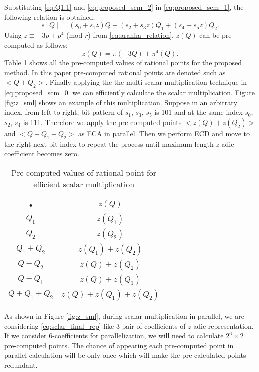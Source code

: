 Substituting \eqref{eq:Q1.1} and \eqref{eq:proposed_scm_2} in \eqref{eq:proposed_scm_1}, the following relation is obtained. 
\begin{equation}\label{eq:proposed_scm_0}
s[Q] =  (s_0+s_1z)Q + (s_2 +s_3z)Q_1 +(s_4+s_5z)Q_2.
\end{equation}
Using $z \equiv -3p + p^4$ (mod $r$) from \eqref{eq:aranha_relation}, $z(Q)$ can be pre-computed as follows:
\begin{equation}
z(Q) = \pi(-3Q) +\pi^4(Q).
\end{equation}
Table \ref{pre-compute} shows all the pre-computed values of rational points for the proposed method. In this paper pre-computed rational points are denoted such as $<Q+Q_2>$. Finally applying the the multi-scalar multiplication technique in \eqref{eq:proposed_scm_0} we can efficiently calculate the scalar multiplication. Figure \ref{fig:z_sml} shows an example of this multiplication. Suppose in an arbitrary index, from left to right, bit pattern of $s_1$, $s_3$, $s_5$ is 101 and at the same index $s_0$, $s_2$, $s_4$ is 111. Therefore we apply the pre-computed points $< z(Q)+z(Q_2) >$ and $<Q+Q_1+Q_2>$ as ECA in parallel. Then we perform ECD and move to the right next bit index to repeat the process until maximum length $z$-adic coefficient becomes zero.

\renewcommand{\baselinestretch}{1.5}
\begin{table}[!ht]
\centering
\caption{ Pre-computed values of rational point for efficient scalar multiplication}
\label{pre-compute}
\begin{tabular}{|c|c|}
\hline 
• & $z(Q)$ \\ 
\hline 
$Q_1$ & $z(Q_1)$  \\ 
\hline 
$Q_2$ & $z(Q_2)$ \\ 
\hline 
$Q_1+Q_2$ & \quad  $ z(Q_1)+ z(Q_2) $ \quad \\ 
\hline 
$Q+Q_2$ & $ z(Q)+ z(Q_2) $ \\ 
\hline 
$Q+Q_1$ & $  z(Q)+ z(Q_1) $ \\ 
\hline 
 \quad $Q+Q_1+Q_2$ \quad  \quad &   \quad  $ z(Q)+ z(Q_1)+ z(Q_2)$  \quad \\ 
\hline 
\end{tabular} 
\end{table}
\renewcommand{\baselinestretch}{1.0}
As shown in Figure \ref{fig:z_sml}, during scalar multiplication in parallel, we are considering \eqref{eq:sclar_final_rep} like 3 pair of coefficients of $z$-adic representation. If we consider 6-coefficients for parallelization, we will need to calculate $2^6 \times 2$ pre-computed points. The chance of appearing each pre-computed point in parallel calculation will be only once which will make the pre-calculated points redundant.  

